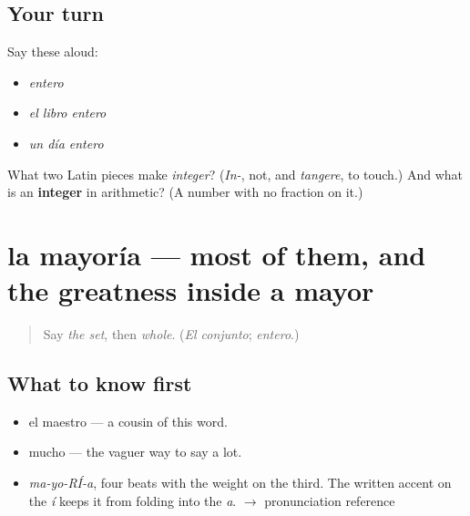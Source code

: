 \subsection*{Your turn}
Say these aloud:

\begin{itemize}
\raggedright
  \item \emph{entero}
  \item \emph{el libro entero}
  \item \emph{un día entero}
\end{itemize}

\begin{tcolorbox}[breakable,colback=teal!4,colframe=teal!35!black,title={Before you move on}]
What two Latin pieces make \emph{integer}? (\emph{In-}, not, and \emph{tangere}, to touch.) And what is an \textbf{integer} in arithmetic? (A number with no fraction on it.)
\end{tcolorbox}
\section[la mayoría]{la mayoría — most of them, and the greatness inside a mayor}

\label{lesson:ES-C352-mayoria}



\begin{quote}
Say \emph{the set}, then \emph{whole}. (\emph{El conjunto}; \emph{entero}.)
\end{quote}

\subsection*{What to know first}
\begin{itemize}
\raggedright
  \item el maestro — a cousin of this word.
  \item mucho — the vaguer way to say a lot.
\end{itemize}

\begin{sounds}
\begin{itemize}
\raggedright
  \item \emph{ma-yo-RÍ-a}, four beats with the weight on the third. The written accent on the \emph{í} keeps it from folding into the \emph{a}. $\to$ pronunciation reference
\end{itemize}
\end{sounds}

